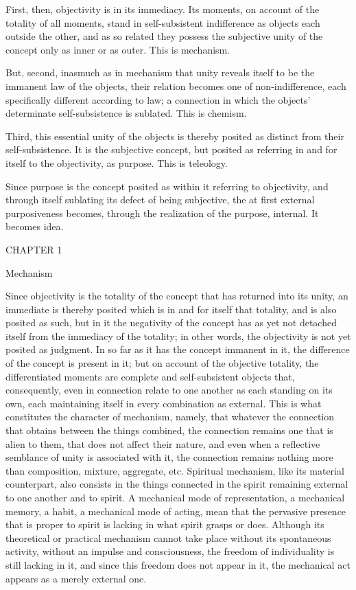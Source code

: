 First, then, objectivity is in its immediacy.
Its moments, on account of the totality of all moments,
stand in self-subsistent indifference
as objects each outside the other,
and as so related they possess
the subjective unity of the concept
only as inner or as outer.
This is mechanism.

But, second, inasmuch as in mechanism that unity
reveals itself to be the immanent law of the objects,
their relation becomes one of non-indifference,
each specifically different according to law;
a connection in which the objects'
determinate self-subsistence is sublated.
This is chemism.

Third, this essential unity of the objects is
thereby posited as distinct from their self-subsistence.
It is the subjective concept,
but posited as referring in and for itself
to the objectivity, as purpose.
This is teleology.

Since purpose is the concept posited
as within it referring to objectivity,
and through itself sublating its defect
of being subjective,
the at first external purposiveness becomes,
through the realization of the purpose, internal.
It becomes idea.

CHAPTER 1

Mechanism

Since objectivity is the totality of the concept
that has returned into its unity,
an immediate is thereby posited
which is in and for itself that totality,
and is also posited as such,
but in it the negativity of the concept has as yet
not detached itself from the immediacy of the totality;
in other words, the objectivity is not yet posited as judgment.
In so far as it has the concept immanent in it,
the difference of the concept is present in it;
but on account of the objective totality,
the differentiated moments are
complete and self-subsistent objects
that, consequently, even in connection
relate to one another as each standing on its own,
each maintaining itself in every combination as external.
This is what constitutes the character of mechanism,
namely, that whatever the connection that
obtains between the things combined,
the connection remains one that is alien to them,
that does not affect their nature,
and even when a reflective semblance
of unity is associated with it,
the connection remains nothing more than
composition, mixture, aggregate, etc.
Spiritual mechanism, like its material counterpart,
also consists in the things connected in the spirit
remaining external to one another and to spirit.
A mechanical mode of representation,
a mechanical memory, a habit, a mechanical mode of acting,
mean that the pervasive presence that is proper to spirit
is lacking in what spirit grasps or does.
Although its theoretical or practical mechanism
cannot take place without its spontaneous activity,
without an impulse and consciousness,
the freedom of individuality is still lacking in it,
and since this freedom does not appear in it,
the mechanical act appears as a merely external one.

